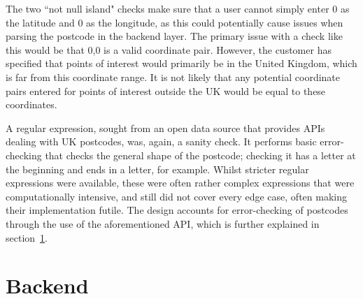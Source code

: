 The two ``not null island" checks make sure that a user cannot simply enter 0 as the latitude and 0 as the longitude, as this could potentially cause issues when parsing the postcode in the backend layer. The primary issue with a check like this would be that 0,0 is a valid coordinate pair. However, the customer has specified that points of interest would primarily be in the United Kingdom, which is far from this coordinate range. It is not likely that any potential coordinate pairs entered for points of interest outside the UK would be equal to these coordinates.

A regular expression, sought from an open data source that provides APIs dealing with UK postcodes\cite{PostcodeRegex}, was, again, a sanity check. It performs basic error-checking that checks the general shape of the postcode; checking it has a letter at the beginning and ends in a letter, for example. Whilst stricter regular expressions were available, these were often rather complex expressions that were computationally intensive, and still did not cover every edge case, often making their implementation futile. The design accounts for error-checking of postcodes through the use of the aforementioned API, which is further explained in section~\ref{sec:backend}. 


\section{Backend}
\label{sec:backend}

